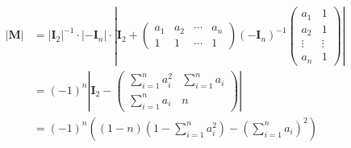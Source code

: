 {\begin{solution}
        \begin{align*}
            \left|\bm{M}\right| & =
            \left|\bm{I}_2\right|^{-1}\cdot
            \left|-\bm{I}_n\right|\cdot
            \left|
            \bm{I}_2+\begin{pmatrix}
                         a_1 & a_2 & \cdots & a_n \\
                         1   & 1   & \cdots & 1
                     \end{pmatrix}\left(-\bm{I}_n\right)^{-1}
            \begin{pmatrix}
                a_1    & 1      \\
                a_2    & 1      \\
                \vdots & \vdots \\
                a_n    & 1
            \end{pmatrix}
            \right|                                        \\
                                & =\left(-1\right)^n\left|
            \bm{I}_2-\begin{pmatrix}
                         \sum\limits_{i=1}^{n}a_i^2 & \sum\limits_{i=1}^{n}a_i \\
                         \sum\limits_{i=1}^{n}a_i   & n
                     \end{pmatrix}
            \right|                                        \\
                                & =\left(-1\right)^n\left(
            \left(1-n\right)
            \left(1-\sum\limits_{i=1}^{n}a_i^2\right)-\left(
                \sum\limits_{i=1}^{n}a_i
                \right)^2
            \right)
        \end{align*}
    \end{solution}
}
